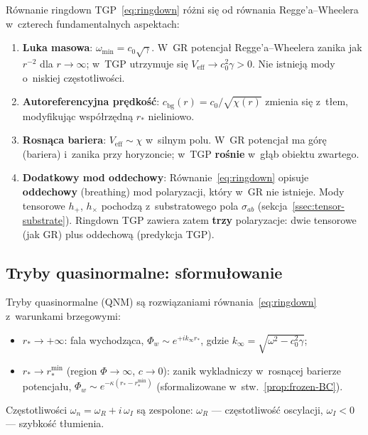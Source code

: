 \begin{remark}\label{rem:vs-RW}
R\'ownanie ringdown TGP~\eqref{eq:ringdown} r\'o\.zni si\k{e}
od r\'ownania Regge'a--Wheelera w~czterech fundamentalnych
aspektach:
\begin{enumerate}[nosep]
  \item \textbf{Luka masowa}: $\omega_{\min} = c_0\sqrt{\gamma}$.
    W~GR potencja\l{} Regge'a--Wheelera zanika jak $r^{-2}$
    dla $r \to \infty$; w~TGP utrzymuje si\k{e} $V_{\mathrm{eff}}
    \to c_0^2\gamma > 0$. Nie istniej\k{a} mody o~niskiej
    cz\k{e}stotliwo\'sci.
  \item \textbf{Autoreferencyjna pr\k{e}dko\'s\'c}:
    $c_{\mathrm{bg}}(r) = c_0/\sqrt{\chi(r)}$ zmienia si\k{e}
    z~t\l{}em, modyfikuj\k{a}c wsp\'o\l{}rz\k{e}dn\k{a} $r_*$
    nieliniowo.
  \item \textbf{Rosn\k{a}ca bariera}: $V_{\mathrm{eff}} \sim \chi$
    w~silnym polu. W~GR potencja\l{} ma g\'or\k{e} (bariera)
    i~zanika przy horyzoncie; w~TGP \textbf{ro\'snie}
    w~g\l{}\k{a}b obiektu zwartego.
  \item \textbf{Dodatkowy mod oddechowy}:
    R\'ownanie~\eqref{eq:ringdown} opisuje \textbf{oddechowy}
    (breathing) mod polaryzacji, kt\'ory w~GR nie istnieje.
    Mody tensorowe $h_+$, $h_\times$ pochodz\k{a}
    z~substratowego pola $\sigma_{ab}$ (sekcja~\ref{ssec:tensor-substrate}).
    Ringdown TGP zawiera zatem \textbf{trzy} polaryzacje:
    dwie tensorowe (jak GR) plus oddechow\k{a} (predykcja TGP).
\end{enumerate}
\end{remark}

\subsection{Tryby quasinormalne: sformu\l{}owanie}

\begin{definition}\label{def:QNM}
Tryby quasinormalne (QNM) s\k{a} rozwi\k{a}zaniami
r\'ownania~\eqref{eq:ringdown} z~warunkami brzegowymi:
\begin{itemize}[nosep]
  \item $r_* \to +\infty$: fala wychodz\k{a}ca,
    $\Phi_w \sim e^{+ik_\infty r_*}$,
    gdzie $k_\infty = \sqrt{\omega^2 - c_0^2\gamma}$;
  \item $r_* \to r_*^{\mathrm{min}}$ (region $\Phi \to \infty$,
    $c \to 0$): zanik wykl{}adniczy w~rosn\k{a}cej barierze
    potencja\l{}u, $\Phi_w \sim e^{-\kappa(r_* - r_*^{\min})}$
    (sformalizowane w~stw.~\ref{prop:frozen-BC}).
\end{itemize}
Cz\k{e}stotliwo\'sci $\omega_n = \omega_R + i\,\omega_I$
s\k{a} zespolone: $\omega_R$ --- cz\k{e}stotliwo\'s\'c oscylacji,
$\omega_I < 0$ --- szybko\'s\'c t\l{}umienia.
\end{definition}

